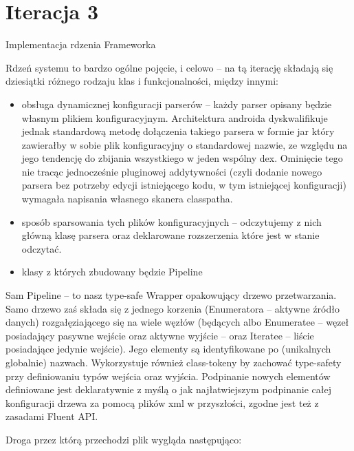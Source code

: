\section{Iteracja 3}

\begin{Note}

	Implementacja rdzenia Frameworka


Rdzeń systemu to bardzo ogólne pojęcie, i celowo -- na tą iterację składają się dziesiątki różnego rodzaju klas i funkcjonalności, między innymi:

\begin{itemize}
    \item obsługa dynamicznej konfiguracji parserów --  każdy parser opisany będzie własnym plikiem konfiguracyjnym. Architektura androida dyskwalifikuje jednak standardową metodę dołączenia takiego parsera w formie jar który zawierałby w sobie plik konfiguracyjny o standardowej nazwie, ze względu na jego tendencję do zbijania wszystkiego w jeden wspólny dex. Ominięcie tego nie tracąc jednocześnie pluginowej addytywności (czyli dodanie nowego parsera bez potrzeby edycji istniejącego kodu, w tym istniejącej konfiguracji) wymagała napisania własnego skanera classpatha.
    \item sposób sparsowania tych plików konfiguracyjnych -- odczytujemy z nich główną klasę parsera oraz deklarowane rozszerzenia które jest w stanie odczytać.
    \item klasy z których zbudowany będzie Pipeline
\end{itemize}

Sam Pipeline -- to nasz type-safe Wrapper opakowujący drzewo przetwarzania. Samo drzewo zaś składa
się z jednego korzenia (Enumeratora -- aktywne źródło danych) rozgałęziającego się na wiele węzłów
(będących albo Enumeratee -- węzeł posiadający pasywne wejście oraz aktywne wyjście -- oraz Iteratee
-- liście posiadające jedynie wejście). Jego elementy są identyfikowane po (unikalnych globalnie) nazwach. Wykorzystuje również class-tokeny by zachować type-safety przy definiowaniu typów wejścia oraz wyjścia. Podpinanie nowych elementów definiowane jest deklaratywnie z myślą o jak najłatwiejszym podpinanie całej konfiguracji drzewa za pomocą plików xml w przyszłości, zgodne jest też z zasadami Fluent API.

Droga przez którą przechodzi plik wygląda następująco:


\end{Note}
